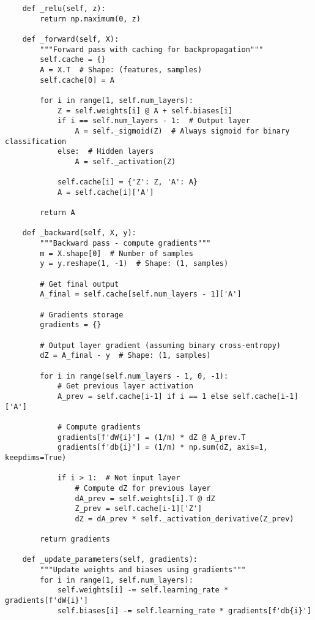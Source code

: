 ﻿\documentclass[12pt,a4paper]{article}
\begin{document}
\begin{lstlisting}
    def _relu(self, z):
        return np.maximum(0, z)
    
    def _forward(self, X):
        """Forward pass with caching for backpropagation"""
        self.cache = {}
        A = X.T  # Shape: (features, samples)
        self.cache[0] = A
        
        for i in range(1, self.num_layers):
            Z = self.weights[i] @ A + self.biases[i]
            if i == self.num_layers - 1:  # Output layer
                A = self._sigmoid(Z)  # Always sigmoid for binary classification
            else:  # Hidden layers
                A = self._activation(Z)
            
            self.cache[i] = {'Z': Z, 'A': A}
            A = self.cache[i]['A']
        
        return A
    
    def _backward(self, X, y):
        """Backward pass - compute gradients"""
        m = X.shape[0]  # Number of samples
        y = y.reshape(1, -1)  # Shape: (1, samples)
        
        # Get final output
        A_final = self.cache[self.num_layers - 1]['A']
        
        # Gradients storage
        gradients = {}
        
        # Output layer gradient (assuming binary cross-entropy)
        dZ = A_final - y  # Shape: (1, samples)
        
        for i in range(self.num_layers - 1, 0, -1):
            # Get previous layer activation
            A_prev = self.cache[i-1] if i == 1 else self.cache[i-1]['A']
            
            # Compute gradients
            gradients[f'dW{i}'] = (1/m) * dZ @ A_prev.T
            gradients[f'db{i}'] = (1/m) * np.sum(dZ, axis=1, keepdims=True)
            
            if i > 1:  # Not input layer
                # Compute dZ for previous layer
                dA_prev = self.weights[i].T @ dZ
                Z_prev = self.cache[i-1]['Z']
                dZ = dA_prev * self._activation_derivative(Z_prev)
        
        return gradients
    
    def _update_parameters(self, gradients):
        """Update weights and biases using gradients"""
        for i in range(1, self.num_layers):
            self.weights[i] -= self.learning_rate * gradients[f'dW{i}']
            self.biases[i] -= self.learning_rate * gradients[f'db{i}']
    

\end{lstlisting}
\end{document}
